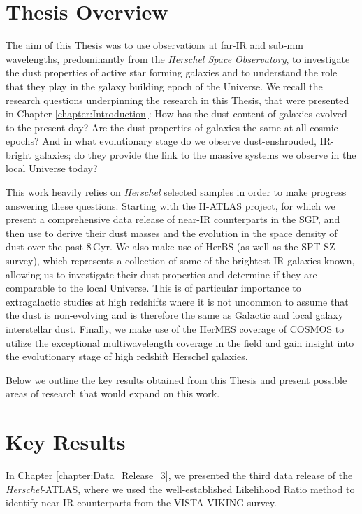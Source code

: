 \section{Thesis Overview}

The aim of this Thesis was to use observations at far-IR and sub-mm wavelengths, predominantly from the \textit{Herschel Space Observatory}, to investigate the dust properties of active star forming galaxies and to understand the role that they play in the galaxy building epoch of the Universe. We recall the research questions underpinning the research in this Thesis, that were presented in Chapter \ref{chapter:Introduction}: How has the dust content of galaxies evolved to the present day? Are the dust properties of galaxies the same at all cosmic epochs? And in what evolutionary stage do we observe dust-enshrouded, IR-bright galaxies; do they provide the link to the massive systems we observe in the local Universe today? 

This work heavily relies on \textit{Herschel} selected samples in order to make progress answering these questions. Starting with the H-ATLAS project, for which we present a comprehensive data release of near-IR counterparts in the SGP, and then use to derive their dust masses and the evolution in the space density of dust over the past $8\,$Gyr. We also make use of HerBS (as well as the SPT-SZ survey), which represents a collection of some of the brightest IR galaxies known, allowing us to investigate their dust properties and determine if they are comparable to the local Universe. This is of particular importance to extragalactic studies at high redshifts where it is not uncommon to assume that the dust is non-evolving and is therefore the same as Galactic and local galaxy interstellar dust. Finally, we make use of the HerMES coverage of COSMOS to utilize the exceptional multiwavelength coverage in the field and gain insight into the evolutionary stage of high redshift Herschel galaxies.

Below we outline the key results obtained from this Thesis and present possible areas of research that would expand on this work.

\section{Key Results}

In Chapter \ref{chapter:Data_Release_3}, we presented the third data release of the \textit{Herschel}-ATLAS, where we used the well-established Likelihood Ratio method to identify near-IR counterparts from the VISTA VIKING survey.

